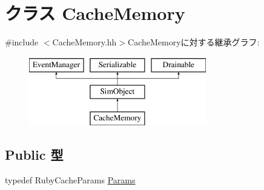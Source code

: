 \hypertarget{classCacheMemory}{
\section{クラス CacheMemory}
\label{classCacheMemory}
}


{\ttfamily \#include $<$CacheMemory.hh$>$}CacheMemoryに対する継承グラフ:\begin{figure}[H]
\begin{center}
\leavevmode
\includegraphics[height=3cm]{classCacheMemory}
\end{center}
\end{figure}
\subsection*{Public 型}
\begin{DoxyCompactItemize}
\item 
typedef RubyCacheParams \hyperlink{classCacheMemory_ae5279e63669c110c0bd87dca490f126d}{Params}
\end{DoxyCompactItemize}
